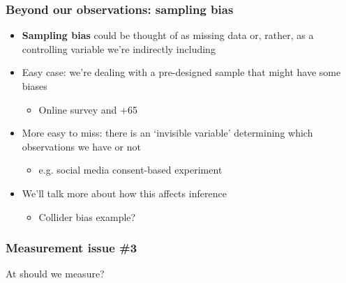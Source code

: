 \documentclass[aspectratio=43]{beamer}
\begin{document}
\begin{frame}
\frametitle{Beyond our observations: sampling bias}
\centering

\begin{itemize}
  \item \textbf{Sampling bias} could be thought of as missing data or, rather, as a controlling variable we're indirectly including
  \item Easy case: we're dealing with a pre-designed sample that might have some biases
  \begin{itemize}
    \item Online survey and +65
  \end{itemize}
  \item<2-> More easy to miss: there is an `invisible variable' determining which observations we have or not
  \begin{itemize}
    \item e.g. social media consent-based experiment
  \end{itemize}
  \item<2-> We'll talk more about how this affects inference
  \begin{itemize}
    \item Collider bias example?
  \end{itemize}
\end{itemize}

\end{frame}

\begin{frame}
\frametitle{Measurement issue \#3}
\centering

At  should we measure?

\end{frame}
\end{document}

